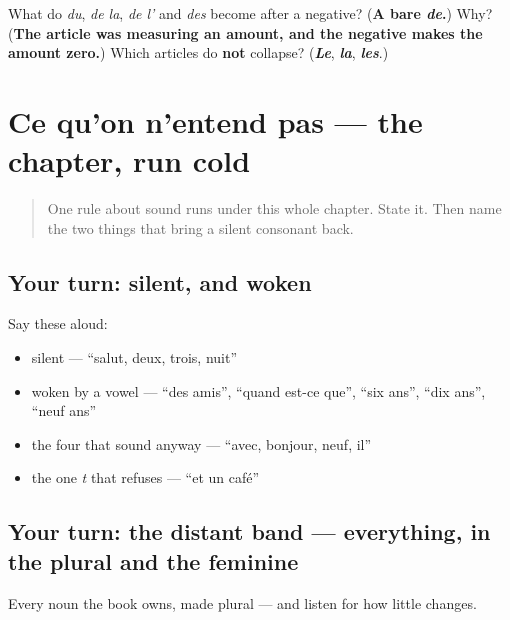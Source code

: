 \begin{tcolorbox}[breakable,colback=teal!4,colframe=teal!35!black,title={Before you move on}]
What do \emph{du}, \emph{de la}, \emph{de l'} and \emph{des} become after a negative? (\textbf{A bare \emph{de}.}) Why? (\textbf{The article was measuring an amount, and the negative makes the amount zero.}) Which articles do \textbf{not} collapse? (\emph{\textbf{Le}}, \emph{\textbf{la}}, \emph{\textbf{les}}.)
\end{tcolorbox}
\section[Practice]{Ce qu'on n'entend pas — the chapter, run cold}

\label{lesson:FR-R38-ce-quon-nentend-pas}



\begin{quote}
One rule about sound runs under this whole chapter. State it. Then name the two things that bring a silent consonant back.
\end{quote}

\subsection*{Your turn: silent, and woken}
Say these aloud:

\begin{itemize}
\raggedright
  \item silent — \textquotedblleft{}salut, deux, trois, nuit\textquotedblright{}
  \item woken by a vowel — \textquotedblleft{}des amis\textquotedblright{}, \textquotedblleft{}quand est-ce que\textquotedblright{}, \textquotedblleft{}six ans\textquotedblright{}, \textquotedblleft{}dix ans\textquotedblright{}, \textquotedblleft{}neuf ans\textquotedblright{}
  \item the four that sound anyway — \textquotedblleft{}avec, bonjour, neuf, il\textquotedblright{}
  \item the one \emph{t} that refuses — \textquotedblleft{}et un café\textquotedblright{}
\end{itemize}

\subsection*{Your turn: the distant band — everything, in the plural and the feminine}
Every noun the book owns, made plural — and listen for how little changes.

